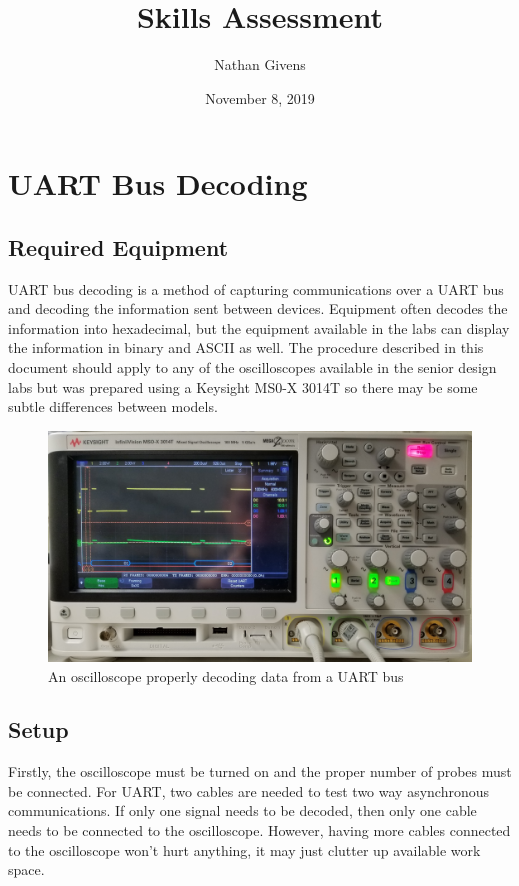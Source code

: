 \documentclass{article}
\title{Skills Assessment}
\author{Nathan Givens}
\date{November 8, 2019}
\begin{document}
  \maketitle

  \section{UART Bus Decoding}

  \subsection{Required Equipment}

  UART bus decoding is a method of capturing communications over a UART bus and
  decoding the information sent between devices. Equipment often decodes the
  information into hexadecimal, but the equipment available in the labs can
  display the information in binary and ASCII as well. The procedure described
  in this document should apply to any of the oscilloscopes available in the
  senior design labs but was prepared using a Keysight MS0-X 3014T so there may
  be some subtle differences between models.

  \begin{figure}[h]
    \includegraphics[width=\textwidth]{images/uart/full_scope.jpg}
    \caption{An oscilloscope properly decoding data from a UART bus}
  \end{figure}

  \subsection{Setup}

  Firstly, the oscilloscope must be turned on and the proper number of probes
  must be connected. For UART, two cables are needed to test two way
  asynchronous communications. If only one signal needs to be decoded, then only
  one cable needs to be connected to the oscilloscope. However, having more
  cables connected to the oscilloscope won't hurt anything, it may just clutter up
  available work space.
\end{document}
